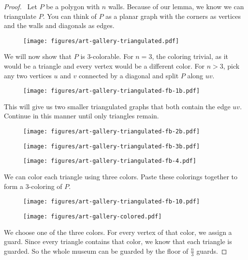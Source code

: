 \documentclass[10pt]{amsart}
\begin{document}
\begin{proof} \
    Let $P$ be a polygon with $n$ walls. 
    Because of our lemma, we know we can triangulate $P$. 
    You can think of $P$ as a planar graph with the corners as vertices and the walls and 
    diagonals as edges. 
    \begin{figure}[h!]
        \centering
        \texttt{[image: figures/art-gallery-triangulated.pdf]}
    \end{figure}

    We will now show that $P$ is 3-colorable. 
    For $n=3$, the coloring trivial, as it would be a triangle and  every vertex would be a 
    different color. 
    For $n>3$, pick any two vertices $u$ and $v$ connected by a diagonal and split $P$ along $uv$. 
    \begin{figure}[h!]
        \centering
        \texttt{[image: figures/art-gallery-triangulated-fb-1b.pdf]}
    \end{figure}

    This will give us two smaller triangulated graphs that both contain the edge $uv$. 
    Continue in this manner until only triangles remain. 
    \begin{figure}[h!]
        \begin{minipage}{.3\textwidth}
            \centering
            \texttt{[image: figures/art-gallery-triangulated-fb-2b.pdf]}          
        \end{minipage}%
        \begin{minipage}{.3\textwidth}
            \centering
            \texttt{[image: figures/art-gallery-triangulated-fb-3b.pdf]}          
        \end{minipage}%
        \begin{minipage}{.3\textwidth}
            \centering
            \texttt{[image: figures/art-gallery-triangulated-fb-4.pdf]}           
        \end{minipage}
    \end{figure}

    \pagebreak

    We can color each triangle using three colors. 
    Paste these colorings together to form a 3-coloring of $P$. 
    \begin{figure}[h!]
        \begin{minipage}{.5\textwidth}
            \centering
            \texttt{[image: figures/art-gallery-triangulated-fb-10.pdf]}      
        \end{minipage}%
        \begin{minipage}{.5\textwidth}
            \centering 
            \texttt{[image: figures/art-gallery-colored.pdf]}          
        \end{minipage}
    \end{figure}

    We choose one of the three colors. 
    For every vertex of that color, we assign a guard. 
    Since every triangle contains that color, we know that each triangle is guarded. 
    So the whole museum can be guarded by the floor of $\frac{n}{3}$ guards.
\end{proof}
\end{document}

